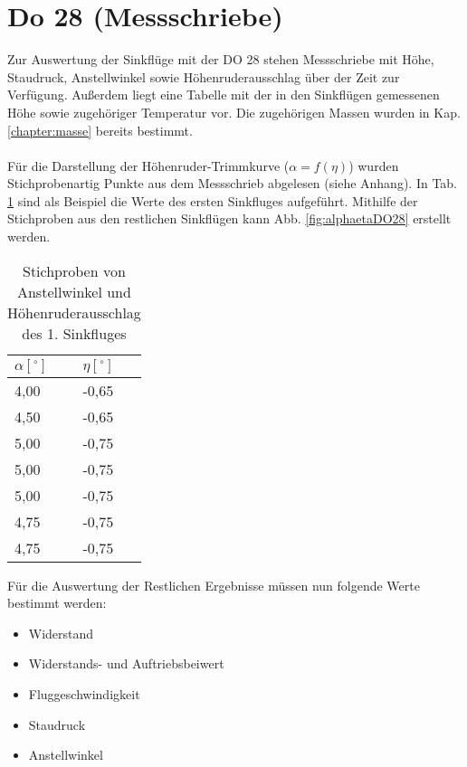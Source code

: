 \vspace{1cm}
\section{Do 28 (Messschriebe)}
Zur Auswertung der Sinkflüge mit der DO 28 stehen Messschriebe mit Höhe, Staudruck, Anstellwinkel sowie Höhenruderausschlag über der Zeit zur Verfügung. Außerdem liegt eine Tabelle mit der in den Sinkflügen gemessenen Höhe sowie zugehöriger Temperatur vor. Die zugehörigen Massen wurden in Kap. \ref{chapter:masse} bereits bestimmt.\\ \\
Für die Darstellung der Höhenruder-Trimmkurve ($\alpha = f(\eta)$) wurden Stichprobenartig Punkte aus dem Messschrieb abgelesen (siehe Anhang). In Tab. \ref{tab:alphaetaDO28} sind als Beispiel die Werte des ersten Sinkfluges aufgeführt. Mithilfe der Stichproben aus den restlichen Sinkflügen kann Abb. \ref{fig:alphaetaDO28} erstellt werden. 

\begin{table}[h]
	\centering
	\begin{tabular}{|l|l|}
		\hline
		$\alpha [^\circ]$ & $\eta [^\circ]$ \\ \hline
		4,00&	-0,65
\\ \hline
		4,50&	-0,65
\\ \hline
		5,00&	-0,75
\\ \hline
		5,00&	-0,75
\\ \hline
		5,00&	-0,75
\\ \hline
		4,75&	-0,75
\\ \hline
		4,75&	-0,75\\ \hline
	\end{tabular}
	\caption{Stichproben von Anstellwinkel und Höhenruderausschlag des 1. Sinkfluges} \label{tab:alphaetaDO28}
\end{table}
\vspace{1cm}
\noindent Für die Auswertung der Restlichen Ergebnisse müssen nun folgende Werte bestimmt werden:

\begin{itemize}
	\item Widerstand
	\item Widerstands- und Auftriebsbeiwert
	\item Fluggeschwindigkeit
	\item Staudruck
	\item Anstellwinkel
\end{itemize} 

